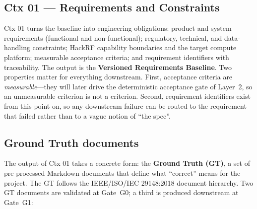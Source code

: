 \documentclass[11pt,a4paper]{article}
\begin{document}
\subsection{Ctx 01 --- Requirements and Constraints}
\label{sec:ctx01}

Ctx 01 turns the baseline into engineering obligations: product and system requirements
(functional and non-functional); regulatory, technical, and data-handling constraints; HackRF
capability boundaries and the target compute platform; measurable acceptance criteria; and
requirement identifiers with traceability. The output is the \textbf{Versioned Requirements
Baseline}. Two properties matter for everything downstream. First, acceptance criteria are
\emph{measurable}---they will later drive the deterministic acceptance gate of Layer~2, so an
unmeasurable criterion is not a criterion. Second, requirement identifiers exist from this point
on, so any downstream failure can be routed to the requirement that failed rather than to a
vague notion of ``the spec''.

\subsection{Ground Truth documents}
\label{sec:gt}

The output of Ctx 01 takes a concrete form: the \textbf{Ground Truth (GT)}, a set of
pre-processed Markdown documents that define what ``correct'' means for the project. The GT
follows the IEEE/ISO/IEC 29148:2018 \cite{ieee29148} document hierarchy. Two GT documents are
validated at Gate~G0; a third is produced downstream at Gate~G1:
\end{document}
